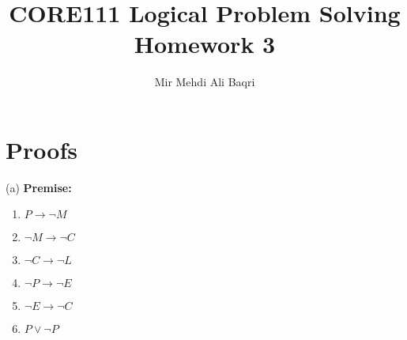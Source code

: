 \documentclass{article}
\title{CORE111 Logical Problem Solving\\Homework 3}
\author{Mir Mehdi Ali Baqri}
\begin{document}
\maketitle

\section{Proofs}

(a) \textbf{Premise:} \\
\begin{enumerate}
   
    \item $P \rightarrow  \neg M$ 
    \item $\neg M \rightarrow \neg C$ 
    \item $\neg C \rightarrow \neg L$ 
    \item $\neg P \rightarrow \neg E$ 
    \item $\neg E \rightarrow \neg C$ 
    \item $P \vee \neg P$ 
    \end{enumerate}
\end{document}
